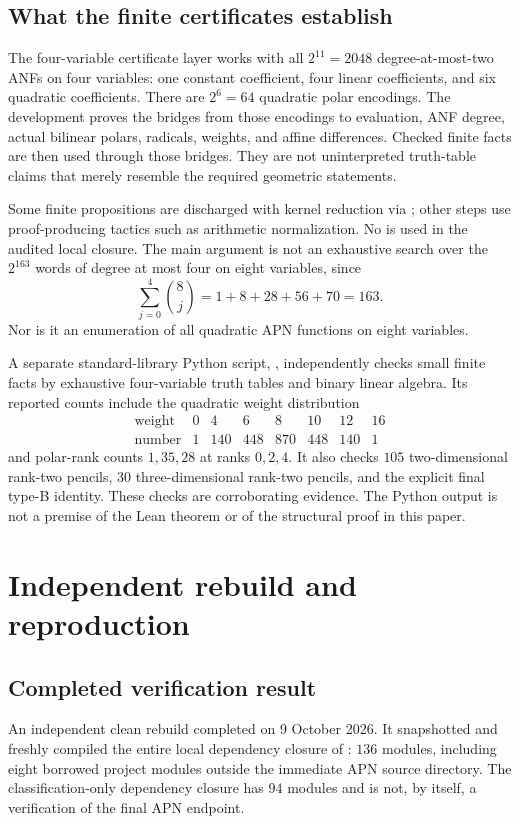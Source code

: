 \subsection{What the finite certificates establish}
The four-variable certificate layer works with all $2^{11}=2048$ degree-at-most-two ANFs on four variables: one constant coefficient, four linear coefficients, and six quadratic coefficients. There are $2^6=64$ quadratic polar encodings. The development proves the bridges from those encodings to evaluation, ANF degree, actual bilinear polars, radicals, weights, and affine differences. Checked finite facts are then used through those bridges. They are not uninterpreted truth-table claims that merely resemble the required geometric statements.

Some finite propositions are discharged with kernel reduction via ; other steps use proof-producing tactics such as arithmetic normalization. No  is used in the audited local closure. The main argument is not an exhaustive search over the $2^{163}$ words of degree at most four on eight variables, since
\[
\sum_{j=0}^4\binom8j=1+8+28+56+70=163.
\]
Nor is it an enumeration of all quadratic APN functions on eight variables.

A separate standard-library Python script, , independently checks small finite facts by exhaustive four-variable truth tables and binary linear algebra. Its reported counts include the quadratic weight distribution
\[
\begin{array}{c|rrrrrrr}
\text{weight}&0&4&6&8&10&12&16\\\hline
\text{number}&1&140&448&870&448&140&1
\end{array}
\]
and polar-rank counts $1,35,28$ at ranks $0,2,4$. It also checks $105$ two-dimensional rank-two pencils, $30$ three-dimensional rank-two pencils, and the explicit final type-B identity. These checks are corroborating evidence. The Python output is not a premise of the Lean theorem or of the structural proof in this paper.

\section{Independent rebuild and reproduction}\label{app:reproduce}
\subsection{Completed verification result}
An independent clean rebuild completed on 9 October 2026. It snapshotted and freshly compiled the entire local dependency closure of : $136$ modules, including eight borrowed project modules outside the immediate APN source directory. The classification-only dependency closure has $94$ modules and is not, by itself, a verification of the final APN endpoint.

